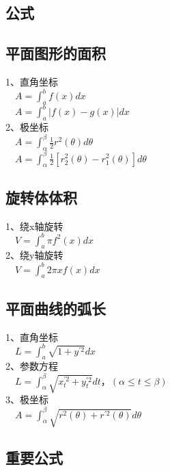 \documentclass{article}
\begin{document}
\begin{flushleft}
	\LARGE
	
	\section{公式}
	
	\subsection{平面图形的面积}
	
	1、直角坐标\\
	\ \ $A=\int_{a}^{b}f(x)dx$\\
	\ \ $A=\int_{a}^{b}|f(x)-g(x)|dx$\\
	2、极坐标\\
	\ \ $A=\int_{\alpha}^{\beta}\frac{1}{2}r^2(\theta)d\theta$\\
	\ \ $A=\int_{\alpha}^{\beta}\frac{1}{2}[r_2^2(\theta)-r_1^2(\theta)]d\theta$\\
	
	\subsection{旋转体体积}
	
	1、绕x轴旋转\\
	\ \ $V=\int_{a}^{b}\pi f^2(x)dx$\\
	2、绕y轴旋转\\
	\ \ $V=\int_{a}^{b}2\pi xf(x)dx$\\
	
	\subsection{平面曲线的弧长}
	
	1、直角坐标\\
	\ \ $L=\int_{a}^{b}\sqrt{1+y^{'2}}dx$\\
	2、参数方程\\
	\ \ $L=\int_{\alpha}^{\beta}\sqrt{x_t^{'2}+y_t^{'2}}dt， (\alpha \le t \le \beta)$\\
	3、极坐标\\
	\ \ $A=\int_{\alpha}^{\beta}\sqrt{r^2(\theta)+r^{'2}(\theta)}d\theta$\\
	
	\subsection{重要公式}
	

\end{flushleft}
\end{document}
